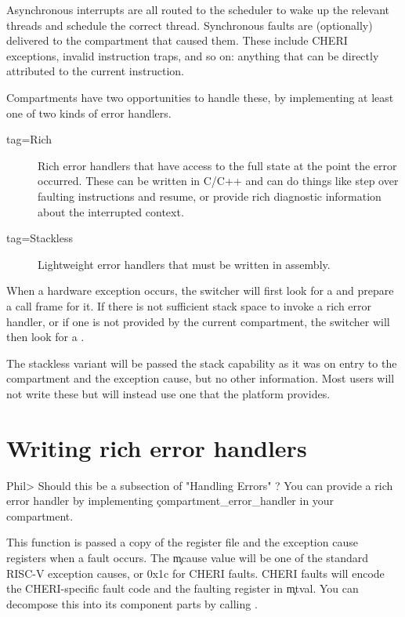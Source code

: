 Asynchronous interrupts are all routed to the scheduler to wake up the relevant threads and schedule the correct thread.
Synchronous faults are (optionally) delivered to the compartment that caused them.
These include CHERI exceptions, invalid instruction traps, and so on: anything that can be directly attributed to the current instruction.

Compartments have two opportunities to handle these, by implementing at least one of two kinds of error handlers.

\begin{description}
	\item[tag=Rich]{Rich error handlers that have access to the full state at the point the error occurred.
		These can be written in C/C++ and can do things like step over faulting instructions and resume, or provide rich diagnostic information about the interrupted context.}
	\item[tag=Stackless]{Lightweight error handlers that must be written in assembly.}
\end{description}

When a hardware exception occurs, the switcher will first look for a  and prepare a call frame for it.
If there is not sufficient stack space to invoke a rich error handler, or if one is not provided by the current compartment, the switcher will then look for a .

The stackless variant will be passed the stack capability as it was on entry to the compartment and the exception cause, but no other information.
Most users will not write these but will instead use one that the platform provides.

\section{Writing rich error handlers}
Phil> Should this be a subsection of "Handling Errors" ? 
You can provide a rich error handler by implementing \c{compartment_error_handler} in your compartment.


This function is passed a copy of the register file and the exception cause registers when a fault occurs.
The \c{mcause} value will be one of the standard RISC-V exception causes, or 0x1c for CHERI faults.
CHERI faults will encode the CHERI-specific fault code and the faulting register in \c{mtval}.
You can decompose this into its component parts by calling .

